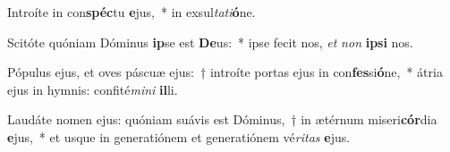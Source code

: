 \item Introíte in con\textbf{spéc}tu \textbf{e}jus,~* in exsul\textit{ta}\textit{ti}\textbf{ó}ne.
\item Scitóte quóniam Dóminus \textbf{ip}se est \textbf{De}us:~* ipse fecit nos, \textit{et} \textit{non} \textbf{ip}\textbf{si} nos.
\item Pópulus ejus, et oves páscuæ ejus:~† introíte portas ejus in con\textbf{fes}si\textbf{ó}ne,~* átria ejus in hymnis: confité\textit{mi}\textit{ni} \textbf{il}li.
\item Laudáte nomen ejus: quóniam suávis est Dóminus,~† in ætérnum miseri\textbf{cór}dia \textbf{e}jus,~* et usque in generatiónem et generatiónem vé\textit{ri}\textit{tas} \textbf{e}jus.
